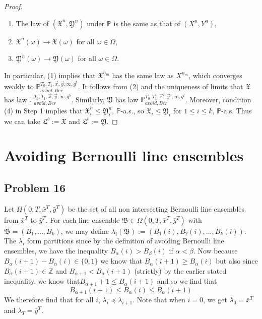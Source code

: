 \documentclass[12pt]{article}
\begin{document}
\begin{proof}
\begin{enumerate}[label=(\arabic*)]
		\item The law of $(\mathfrak{X}^n,\mathfrak{Y}^n)$ under $\mathbb{P}$ is the same as that of $(X^n,Y^n)$,
		
		\item $\mathfrak{X}^n(\omega) \longrightarrow \mathfrak{X}(\omega)$ for all $\omega\in\Omega$,
		
		\item $\mathfrak{Y}^n(\omega) \longrightarrow \mathfrak{Y}(\omega)$ for all $\omega\in\Omega$.
		
	\end{enumerate}

	In particular, (1) implies that $\mathfrak{X}^{n_m}$ has the same law as $X^{n_m}$, which converges weakly to $\mathbb{P}_{avoid,Ber}^{T_0,T_1,\vec{x},\vec{y},\infty,g^b}$. It follows from (2) and the uniqueness of limits that $\mathfrak{X}$ has law $\mathbb{P}_{avoid,Ber}^{T_0,T_1,\vec{x},\vec{y},\infty,g^b}$. Similarly, $\mathfrak{Y}$ has law $\mathbb{P}_{avoid,Ber}^{T_0,T_1,\vec{x}',\vec{y}',\infty,g^t}$. Moreover, condition (4) in Step 1 implies that $\mathfrak{X}^n_i \leq \mathfrak{Y}^n_i$, $\mathbb{P}$-a.s., so $\mathfrak{X}_i \leq \mathfrak{Y}_i$ for $1\leq i\leq k$, $\mathbb{P}$-a.s. Thus we can take $\mathfrak{L}^b := \mathfrak{X}$ and $\mathfrak{L}^t := \mathfrak{Y}$.
	
	\end{proof}


\section{Avoiding Bernoulli line ensembles}

	\subsection*{Problem 16}
	Let $\Omega(0,T,\bar x^T, \bar y ^T)$ be the set of all non intersecting Bernoulli line ensembles from $\bar x^T$ to $\bar y^T$. For each line ensemble $\mathfrak{B}\in \Omega(0,T,\bar x^T,\bar y^T)$ with $\mathfrak B=(B_1,...,B_k)$, we may define $\lambda_i(\mathfrak B):=(B_1(i),B_2(i),...,B_k(i))$. 
The $\lambda_i$ form partitions since by the definition of avoiding Bernoulli line ensembles, we have the inequality $B_\alpha(i)>B_\beta(i)$ if $\alpha<\beta$. 
Now because $B_\alpha(i+1)-B_\alpha(i)\in \{0,1\}$ we know that $B_\alpha(i+1)\geq B_\alpha(i)$ but also since $B_\alpha(i+1)\in \mathbb{Z}$ and $B_{\alpha+1}<B_\alpha(i+1)$ (strictly) by the earlier stated inequality, we know that$B_{\alpha+1}+1\leq B_\alpha(i+1)$ and so we find that 
\[B_{\alpha+1}(i+1)\leq B_\alpha(i)\leq B_\alpha(i+1)\]
We therefore find that for all $i$, $\lambda_i\preceq \lambda_{i+1}$. Note that when $i=0$, we get $\lambda_0=\bar x^T$ and $\lambda_T=\bar y^T$.
\end{document}
